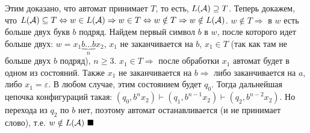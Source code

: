 \documentclass[a4paper]{article}
\begin{document}
\begin{enumerate}[1.]
\begin{enumerate}[a.]
\end{enumerate}
Этим доказано, что автомат принимает $T$, то есть, $L({\cal A})\supseteq T$.\newline
Теперь докажем, что $L({\cal A})\subseteq T\Leftrightarrow w\in L({\cal A})\Rightarrow w\in T\Leftrightarrow w\notin T\Rightarrow w\notin L({\cal A})$.\newline
$w\notin T\Rightarrow$ в $w$ есть больше двух букв $b$ подряд. Найдем первый символ $b$ в $w$, после которого идет больше двух: $w=x_1\underbrace{b\dots b}_{n}x_2$, $x_1$ не заканчивается на $b$, $x_1\in T$ (так как там не больше двух $b$ подряд), $n\geqslant 3$.\newline
$x_1\in T\Rightarrow$ после обработки $x_1$ автомат будет в одном из состояний. Также $x_1$ не заканчивается на $b\Rightarrow$ либо заканчивается на $a$, либо $x_1=\varepsilon$. В любом случае, этим состоянием будет $q_0$. Тогда дальнейшая цепочка конфигураций такая: $(q_0,b^nx_2)\vdash(q_1,b^{n-1}x_2)\vdash(q_2,b^{n-2}x_2)$. Но перехода из $q_2$ по $b$ нет, поэтому автомат останавливается (и не принимает слово), т.е. $w\notin L({\cal A})~\blacksquare$
\end{enumerate}
\end{document}
